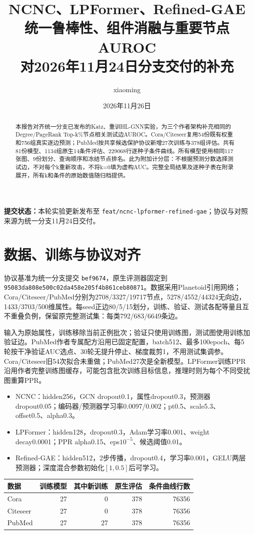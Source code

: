 \documentclass[UTF8,a4paper,11pt,fontset=fandol]{ctexart}
\title{\textbf{NCNC、LPFormer、Refined-GAE}\\统一鲁棒性、组件消融与重要节点AUROC\\\large 对2026年11月24日分支交付的补充}
\author{xiaoming}\date{2026年11月26日}
\newcommand{\code}[1]{{\small\nolinkurl{#1}}}
\begin{document}
\maketitle
\begin{abstract}
本报告对齐统一分支已发布的Katz、重训HL-GNN实验，为三个作者架构补充相同的Degree/PageRank Top-k\%节点相关测试边AUROC。Cora/Citeseer复用54份既有权重和756组真实逐边预测；PubMed按共享候选保护协议新增27次训练与378组评估。共有81份模型、1134组原生14条件评估、229068行逐种子条件曲线。所有模型使用相同117张图、9份划分、查询顺序和冻结节点排名。此为附加计分层：不根据预测分数选择测试边，不对每个k重新攻击，不将k=0填为虚构AUC。完整全局结果及逐种子表在附录展开，所有k和条件的原始数值随归档提供。
\end{abstract}
\noindent\textbf{提交状态：}本轮实验更新发布至 \code{feat/ncnc-lpformer-refined-gae}；协议与对照来源为统一分支11月24日交付。
\tableofcontents\clearpage
\section{数据、训练与协议对齐}
协议基准为统一分支提交 \code{bef9674}，原生评测器固定到 \code{95083da808e500c02da458e205f4b861ceb80871}。数据采用Planetoid引用网络\cite{yang2016planetoid}；Cora/Citeseer/PubMed分别为2708/3327/19717节点，5278/4552/44324无向边，1433/3703/500维属性。每seed正边80/5/15划分，训练、验证、测试各配等量且互不重叠负例，保留原完整测试集：每类792/683/6649条边。

输入为原始属性，训练移除当前正例批次；验证只使用训练图，测试图使用训练加验证边。PubMed作者专属配方沿用已固定配置，batch512、最多100epoch、每5轮按干净验证AUC选点、30轮无提升停止、梯度裁剪1，不用测试集调参。Cora/Citeseer旧54次拟合未重做；PubMed27次是全新模型。LPFormer训练PPR沿用作者完整训练图缓存，可能包含批次训练目标信息，推理时则为每个不同受扰图重算PPR。

\begin{itemize}
\item NCNC：hidden256，GCN dropout0.1，属性dropout0.3，预测器dropout0.05；编码器/预测器学习率0.0097/0.002；pt0.5、scale5.3、offset0.5、alpha0.3。
\item LPFormer：hidden128，dropout0.3，Adam学习率0.001、weight decay0.0001；PPR alpha0.15、eps$10^{-5}$、候选阈值0.01。
\item Refined-GAE：hidden512，2步传播，dropout0.4，学习率0.001，GELU两层预测器；深度混合参数初始化$[1,0.5]$后可学习。
\end{itemize}

\begin{center}\small\begin{tabular}{lrrrr}\toprule
数据&训练模型&其中新训练&原生评估&条件曲线行数\\\midrule
Cora&27&0&378&76356\\
Citeseer&27&0&378&76356\\
PubMed&27&27&378&76356\\\bottomrule\end{tabular}\end{center}
\end{document}
